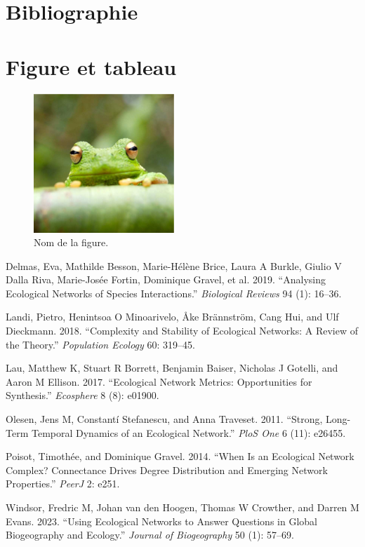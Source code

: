 \documentclass[9pt,twocolumn,twoside,]{pnas-new}
\newlength{\cslhangindent}
\newlength{\cslentryspacingunit} %
\newenvironment{CSLReferences}[2] %
 {%
  \setlength{\parindent}{0pt}
  \ifodd #1
  \let\oldpar\par
  \def\par{\hangindent=\cslhangindent\oldpar}
  \fi
  \setlength{\parskip}{#2\cslentryspacingunit}
 }%
 {}
\begin{document}
\hypertarget{bibliographie}{%
\section{Bibliographie}\label{bibliographie}}

\hypertarget{figure-et-tableau}{%
\section{Figure et tableau}\label{figure-et-tableau}}

\begin{figure}
\centering
\includegraphics{frog.png}
\caption{Nom de la figure.}
\end{figure}

\hypertarget{refs}{}
\begin{CSLReferences}{1}{0}
\leavevmode{}%
Delmas, Eva, Mathilde Besson, Marie-Hélène Brice, Laura A Burkle, Giulio
V Dalla Riva, Marie-Josée Fortin, Dominique Gravel, et al. 2019.
{``Analysing Ecological Networks of Species Interactions.''}
\emph{Biological Reviews} 94 (1): 16--36.

\leavevmode{}%
Landi, Pietro, Henintsoa O Minoarivelo, Åke Brännström, Cang Hui, and
Ulf Dieckmann. 2018. {``Complexity and Stability of Ecological Networks:
A Review of the Theory.''} \emph{Population Ecology} 60: 319--45.

\leavevmode{}%
Lau, Matthew K, Stuart R Borrett, Benjamin Baiser, Nicholas J Gotelli,
and Aaron M Ellison. 2017. {``Ecological Network Metrics: Opportunities
for Synthesis.''} \emph{Ecosphere} 8 (8): e01900.

\leavevmode{}%
Olesen, Jens M, Constantí Stefanescu, and Anna Traveset. 2011.
{``Strong, Long-Term Temporal Dynamics of an Ecological Network.''}
\emph{PloS One} 6 (11): e26455.

\leavevmode{}%
Poisot, Timothée, and Dominique Gravel. 2014. {``When Is an Ecological
Network Complex? Connectance Drives Degree Distribution and Emerging
Network Properties.''} \emph{PeerJ} 2: e251.

\leavevmode{}%
Windsor, Fredric M, Johan van den Hoogen, Thomas W Crowther, and Darren
M Evans. 2023. {``Using Ecological Networks to Answer Questions in
Global Biogeography and Ecology.''} \emph{Journal of Biogeography} 50
(1): 57--69.

\end{CSLReferences}



% 
\end{document}
